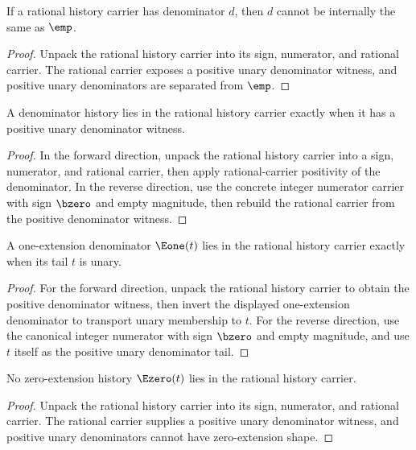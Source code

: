 \begin{theorem}
\label{thm:rat-history-carrier-not-empty}
If a rational history carrier has denominator \(d\), then \(d\) cannot be
internally the same as \(\emp\).
\end{theorem}
\begin{proof}
Unpack the rational history carrier into its sign, numerator, and rational
carrier. The rational carrier exposes a positive unary denominator witness, and
positive unary denominators are separated from \(\emp\).
\end{proof}

\begin{theorem}
\label{thm:rat-history-carrier-positive-denominator-equivalence}
A denominator history lies in the rational history carrier exactly when it has
a positive unary denominator witness.
\end{theorem}
\begin{proof}
In the forward direction, unpack the rational history carrier into a sign,
numerator, and rational carrier, then apply rational-carrier positivity of the
denominator. In the reverse direction, use the concrete integer numerator
carrier with sign $\bzero$ and empty magnitude, then rebuild the rational
carrier from the positive denominator witness.
\end{proof}

\begin{theorem}
\label{thm:rat-history-carrier-e1-tail-unary-iff}
A one-extension denominator \(\Eone(t)\) lies in the rational history carrier
exactly when its tail \(t\) is unary.
\end{theorem}
\begin{proof}
For the forward direction, unpack the rational history carrier to obtain the
positive denominator witness, then invert the displayed one-extension
denominator to transport unary membership to \(t\). For the reverse direction,
use the canonical integer numerator with sign \(\bzero\) and empty magnitude,
and use \(t\) itself as the positive unary denominator tail.
\end{proof}

\begin{theorem}
\label{thm:rat-history-carrier-e0-absurd}
No zero-extension history \(\Ezero(t)\) lies in the rational history carrier.
\end{theorem}
\begin{proof}
Unpack the rational history carrier into its sign, numerator, and rational
carrier. The rational carrier supplies a positive unary denominator witness,
and positive unary denominators cannot have zero-extension shape.
\end{proof}

